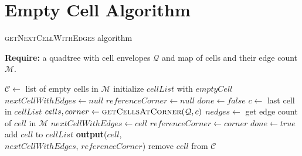 \section{Empty Cell Algorithm}\label{app:emptycells}
\begin{algorithm}\caption{\textsc{getNextCellWithEdges} algorithm}
    \textbf{Require:} a quadtree with cell envelopes $\mathcal Q$ and map of cells and their edge count $\mathcal M$.
    \begin{algorithmic}[1]
        \State $\mathcal C \gets $ list of empty cells in $\mathcal M$
            \State initialize $cellList$ with $emptyCell$ 
            \State $nextCellWithEdges \gets null$
            \State $referenceCorner \gets null$
            \State $done \gets false$
                \State $c \gets $ last cell in $cellList$ 
                \State $cells, corner \gets \textsc{getCellsAtCorner}(\mathcal Q, c)$ 
                    \State $nedges \gets$ get edge count of $cell$ in $\mathcal M$ 
                        \State $nextCellWithEdges \gets cell$
                        \State $referenceCorner \gets corner$
                        \State $done \gets true$
                    \Else
                        \State add $cell$ to $cellList$
                    \EndIf
                \EndFor
            \EndWhile
                \State \textbf{output}($cell$, \\
                \hspace{2.5cm} $nextCellWithEdges$, $referenceCorner$)
                \State remove $cell$ from $\mathcal C$
            \EndFor
        \EndFor
    \EndFunction
    \end{algorithmic}
\end{algorithm}

